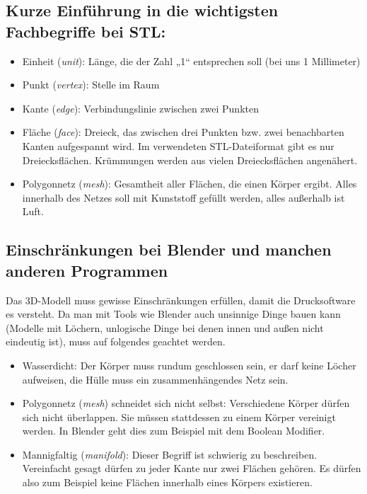 \documentclass{\basedir/fablab-document}
\newcommand{\fachbegriff}[1]{(\textit{#1})}
\begin{document}
\subsection{Kurze Einführung in die wichtigsten Fachbegriffe bei STL:}

\begin{itemize}
\item Einheit \fachbegriff{unit}: Länge, die der Zahl „1“ entsprechen soll (bei uns
1 Millimeter)
\item Punkt \fachbegriff{vertex}: Stelle im Raum
\item Kante \fachbegriff{edge}: Verbindungslinie zwischen zwei Punkten
\item Fläche \fachbegriff{face}: Dreieck, das zwischen drei Punkten bzw. zwei
benachbarten Kanten aufgespannt wird. Im verwendeten STL-Dateiformat
gibt es nur Dreiecksflächen. Krümmungen werden aus vielen
Dreiecksflächen angenähert.
\item Polygonnetz \fachbegriff{mesh}: Gesamtheit aller Flächen, die einen Körper
ergibt. Alles innerhalb des Netzes soll mit Kunststoff gefüllt werden,
alles außerhalb ist Luft.
\end{itemize}

\subsection{Einschränkungen bei Blender und manchen anderen Programmen} \label{lowlevel-einschraenkungen}

Das 3D-Modell muss gewisse Einschränkungen erfüllen, damit die Drucksoftware es versteht. Da man mit Tools wie Blender auch unsinnige Dinge bauen kann (Modelle mit Löchern, unlogische Dinge bei denen innen und außen nicht eindeutig ist), muss auf folgendes geachtet werden.
\begin{itemize}
\item Wasserdicht: Der Körper muss rundum geschlossen sein, er darf keine
Löcher aufweisen,  die Hülle muss ein zusammenhängendes Netz sein.
\item Polygonnetz \fachbegriff{mesh} schneidet sich nicht selbst: Verschiedene
Körper dürfen sich nicht überlappen. Sie müssen stattdessen zu einem
Körper vereinigt werden. In Blender geht dies zum Beispiel mit dem
Boolean Modifier.
\item Mannigfaltig \fachbegriff{manifold}: Dieser Begriff ist schwierig zu
beschreiben. Vereinfacht gesagt dürfen zu jeder Kante nur zwei Flächen
gehören. Es dürfen also zum Beispiel keine Flächen innerhalb eines
Körpers existieren.
\end{itemize}
\end{document}
